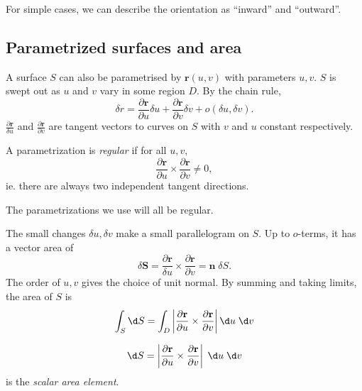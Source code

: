 \documentclass[a4paper]{article}
\begin{document}
For simple cases, we can describe the orientation as ``inward'' and ``outward''.

\subsection{Parametrized surfaces and area}
A surface $S$ can also be parametrised by $\mathbf{r}(u, v)$ with parameters $u, v$. $S$ is swept out as $u$ and $v$ vary in some region $D$. By the chain rule, 
\[
  \delta r = \frac{\partial \mathbf{r}}{\partial u}\delta u + \frac{\partial \mathbf{r}}{\partial v}\delta v + o(\delta u, \delta v).
\]
$\frac{\partial \mathbf{r}}{\delta u}$ and $\frac{\partial \mathbf{r}}{\partial v}$ are tangent vectors to curves on $S$ with $v$ and $u$ constant respectively.

\begin{defi}
  A parametrization is \emph{regular} if for all $u, v$,
  \[
    \frac{\partial \mathbf{r}}{\partial u}\times \frac{\partial \mathbf{r}}{\partial v} \not = 0,
  \]
  ie. there are always two independent tangent directions.
\end{defi}
The parametrizations we use will all be regular.

The small changes $\delta u, \delta v$ make a small parallelogram on $S$. Up to $o$-terms, it has a vector area of 
\[
  \delta \mathbf{S} = \frac{\partial \mathbf{r}}{\delta u}\times \frac{\partial \mathbf{r}}{\partial v} = \mathbf{n}\;\delta S.
\]
The order of $u, v$ gives the choice of unit normal. By summing and taking limits, the area of $S$ is
\[
  \int_S \d S  = \int_D \left|\frac{\partial \mathbf{r}}{\partial u}\times \frac{\partial \mathbf{r}}{\partial v}\right| \d u\;\d v
\]
\begin{prop}
  \[
    \d S = \left|\frac{\partial \mathbf{r}}{\partial u}\times \frac{\partial \mathbf{r}}{\partial v}\right|\;\d u\;\d v
  \]
  is the \emph{scalar area element}.
\end{prop}
\end{document}
